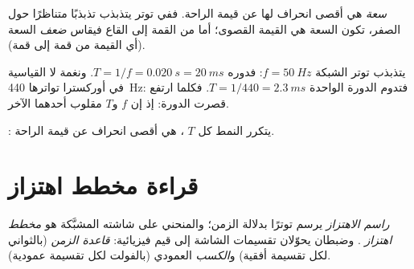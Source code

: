 \begin{definition}[السعة]\label{def:g10:signals-and-waves:amplitude}
\emph{سعة}  هي أقصى انحراف
لها عن قيمة الراحة. ففي توتر يتذبذب تذبذبًا متناظرًا
حول الصفر، تكون السعة هي القيمة القصوى؛ أما من القمة إلى القاع فيقاس
\emph{ضعف} السعة (أي القيمة من قمة إلى قمة).
\end{definition}

\begin{example}\label{ex:g10:signals-and-waves:mains}
يتذبذب توتر الشبكة  $f = \qty{50}{Hz}$: فدوره
$T = 1/f = \qty{0.020}{s} = \qty{20}{ms}$. ونغمة لا القياسية في أوركسترا
  تواترها \qty{440}{Hz}: فتدوم الدورة الواحدة
$T = 1/440 = \qty{2.3}{ms}$. فكلما ارتفع  قصرت الدورة: إذ إن $f$ و$T$
مقلوب أحدهما الآخر.
\end{example}

\begin{omfigure}

{\small {}: يتكرر النمط كل $T$ ، 
هي أقصى انحراف عن قيمة الراحة.}
\end{omfigure}

\section{قراءة مخطط اهتزاز}

\begin{definition}\label{def:g10:signals-and-waves:oscilloscope}
\emph{راسم الاهتزاز} يرسم توترًا بدلالة الزمن؛
والمنحني على شاشته المشبَّكة هو \emph{مخطط اهتزاز}%
. وضبطان يحوّلان تقسيمات الشاشة إلى قيم
فيزيائية: \emph{قاعدة الزمن} (بالثواني لكل تقسيمة
أفقية) و\emph{الكسب} العمودي (بالفولت لكل تقسيمة
عمودية).
\end{definition}

